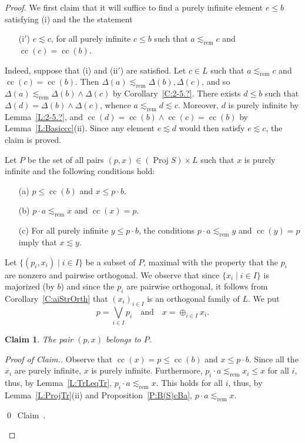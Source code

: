 \documentclass[psamsfonts,reqno]{memo-l}
\theoremstyle{plain}
\newtheorem{claim}{Claim}
\theoremstyle{definition}
\theoremstyle{remark}
\newcommand{\qedc}{{\qed}~{\rm Claim~{\theclaim}.}}
\newenvironment{cproof}
{\begin{proof}[Proof of Claim.]}
{\qedc\renewcommand{\qed}{}\end{proof}}
\numberwithin{equation}{section}
\newcommand{\srem}{\lesssim_{\mathrm{rem}}}
\DeclareMathOperator{\cc}{cc}
\DeclareMathOperator{\BB}{Proj}
\newcommand{\DD}{\Delta}
\newcommand{\set}[1]{\{#1\}}
\newcommand{\setm}[2]{\set{#1\mid#2}}
\newcommand{\famm}[2]{(#1)_{#2}}
\begin{document}
\begin{proof}
We first claim that it will suffice to find a purely infinite element
$e\leq b$ satisfying (i) and the the statement
\begin{itemize}
\item[(i$'$)] $e\lesssim c$, for all purely infinite $c\leq b$ such that
$a\srem c$ and $\cc(c)=\cc(b)$.
\end{itemize}

Indeed, suppose that (i) and (ii$'$) are satisfied. Let $c\in L$ such that
$a\srem c$ and $\cc(c)=\cc(b)$. Then $\DD(a)\srem\DD(b),\DD(c)$, and so
$\DD(a)\srem\DD(b)\wedge\DD(c)$ by Corollary~\ref{C:2-5.?}. There exists
$d\leq b$ such that $\DD(d)=\DD(b)\wedge\DD(c)$, whence
$a\srem d\lesssim c$. Moreover, $d$ is purely infinite by
Lemma~\ref{L:2-5.?}, and $\cc(d)=\cc(b)\wedge\cc(c)=\cc(b)$ by
Lemma~\ref{L:Basiccc}(ii). Since any element $e\lesssim d$ would then
satisfy $e\lesssim c$, the claim is proved.

Let $P$ be the set of all pairs $(p,x)\in(\BB{S})\times
L$\index{pzzroj@$\BB{S}$} such that
$x$ is purely infinite and the following conditions hold:
\begin{itemize}
\item[(a)] $p\leq\cc(b)$ and $x\leq p\cdot b$.

\item[(b)] $p\cdot a\srem x$ and $\cc(x)=p$.

\item[(c)] For all purely infinite $y\leq p\cdot b$, the conditions
$p\cdot a\srem y$ and $\cc(y)=p$ imply that $x\lesssim y$.
\end{itemize}

Let $\setm{(p_i,x_i)}{i\in I}$ be a subset of $P$, maximal with the
property that the $p_i$ are nonzero and pairwise orthogonal. We observe
that since $\setm{x_i}{i\in I}$ is majorized (by $b$) and since the $p_i$
are pairwise orthogonal, it follows from Corollary~\ref{C:aiStrOrth} that
$\famm{x_i}{i\in I}$ is an orthogonal family of $L$. We put
   \[
   p=\bigvee_{i\in I}p_i\quad\text{and}\quad x=\oplus_{i\in I}x_i.
   \]

\setcounter{claim}{0}
\begin{claim}
The pair $(p,x)$ belongs to $P$.
\end{claim}

\begin{cproof}
Observe that $\cc(x)=p\leq\cc(b)$ and $x\leq p\cdot b$.
Since all the $x_i$ are purely infinite, $x$ is purely infinite.
Furthermore, $p_i\cdot a\srem x_i\leq x$ for all $i$, thus,
by Lemma~\ref{L:TrLeqTr},
$p_i\cdot a\srem x$. This holds for all $i$, thus, by
Lemma~\ref{L:ProjTr}(ii) and Proposition~\ref{P:B(S)cBa}, $p\cdot a\srem x$.


\end{cproof}
\end{proof}
\end{document}
